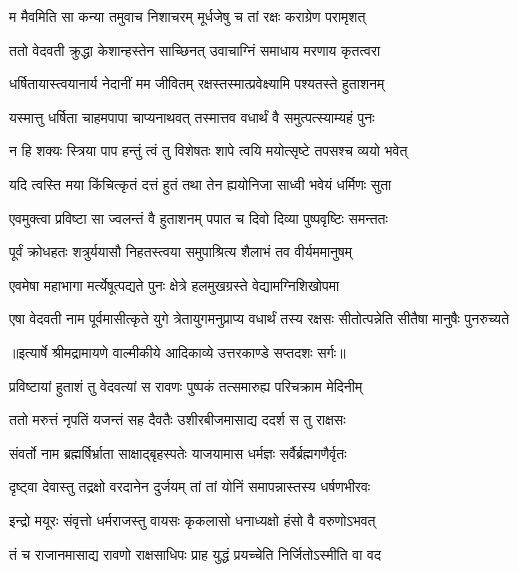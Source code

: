 \twolineshloka
{म मैवमिति सा कन्या तमुवाच निशाचरम्}
{मूर्धजेषु च तां रक्षः कराग्रेण परामृशत्} %

\twolineshloka
{ततो वेदवती क्रुद्धा केशान्हस्तेन साच्छिनत्}
{उवाचाग्निं समाधाय मरणाय कृतत्वरा} %

\twolineshloka
{धर्षितायास्त्वयानार्य नेदानीं मम जीवितम्}
{रक्षस्तस्मात्प्रवेक्ष्यामि पश्यतस्ते हुताशनम्} %

\twolineshloka
{यस्मात्तु धर्षिता चाहमपापा चाप्यनाथवत्}
{तस्मात्तव वधार्थं वै समुत्पत्स्याम्यहं पुनः} %

\twolineshloka
{न हि शक्यः स्त्रिया पाप हन्तुं त्वं तु विशेषतः}
{शापे त्वयि मयोत्सृष्टे तपसश्च व्ययो भवेत्} %

\twolineshloka
{यदि त्वस्ति मया किंचित्कृतं दत्तं हुतं तथा}
{तेन ह्ययोनिजा साध्वी भवेयं धर्मिणः सुता} %

\twolineshloka
{एवमुक्त्वा प्रविष्टा सा ज्वलन्तं वै हुताशनम्}
{पपात च दिवो दिव्या पुष्पवृष्टिः समन्ततः} %

\twolineshloka
{पूर्वं क्रोधहतः शत्रुर्ययासौ निहतस्त्वया}
{समुपाश्रित्य शैलाभं तव वीर्यममानुषम्} %

\twolineshloka
{एवमेषा महाभागा मर्त्येषूत्पद्यते पुनः}
{क्षेत्रे हलमुखग्रस्ते वेद्यामग्निशिखोपमा} %

\threelineshloka
{एषा वेदवती नाम पूर्वमासीत्कृते युगे}
{त्रेतायुगमनुप्राप्य वधार्थं तस्य रक्षसः}
{सीतोत्पन्नेति सीतैषा मानुषैः पुनरुच्यते} %


{॥इत्यार्षे श्रीमद्रामायणे वाल्मीकीये आदिकाव्ये उत्तरकाण्डे सप्तदशः सर्गः॥}


\twolineshloka
{प्रविष्टायां हुताशं तु वेदवत्यां स रावणः}
{पुष्पकं तत्समारुह्य परिचक्राम मेदिनीम्} %

\twolineshloka
{ततो मरुत्तं नृपतिं यजन्तं सह दैवतैः}
{उशीरबीजमासाद्य ददर्श स तु राक्षसः} %

\twolineshloka
{संवर्तो नाम ब्रह्मर्षिर्भ्राता साक्षाद्बृहस्पतेः}
{याजयामास धर्मज्ञः सर्वैर्ब्रह्मगणैर्वृतः} %

\twolineshloka
{दृष्ट्वा देवास्तु तद्रक्षो वरदानेन दुर्जयम्}
{तां तां योनिं समापन्नास्तस्य धर्षणभीरवः} %

\twolineshloka
{इन्द्रो मयूरः संवृत्तो धर्मराजस्तु वायसः}
{कृकलासो धनाध्यक्षो हंसो वै वरुणोऽभवत्} %

\twolineshloka
{तं च राजानमासाद्य रावणो राक्षसाधिपः}
{प्राह युद्धं प्रयच्चेति निर्जितोऽस्मीति वा वद} %

